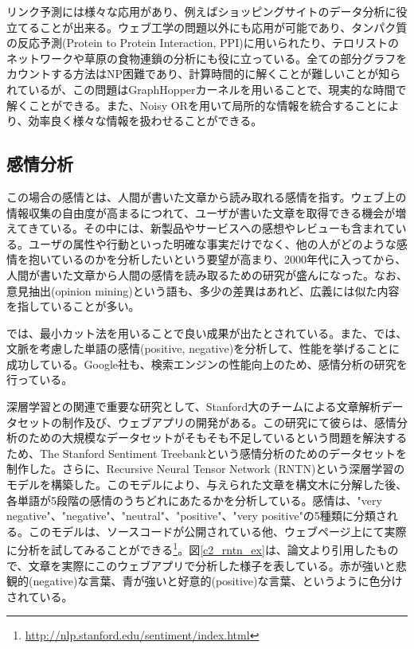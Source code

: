 リンク予測には様々な応用があり、例えばショッピングサイトのデータ分析に役立てることが出来る\cite{clauset2004finding}。ウェブ工学の問題以外にも応用が可能であり、タンパク質の反応予測(Protein to Protein Interaction, PPI)に用いられたり\cite{bader2003gaining}、テロリストのネットワークや草原の食物連鎖の分析にも役に立っている\cite{clauset2008hierarchical}。全ての部分グラフをカウントする方法はNP困難であり、計算時間的に解くことが難しいことが知られている\cite{gartner2003on-graph}が、この問題はGraphHopperカーネルを用いることで、現実的な時間で解くことができる\cite{feragen2013scalable}。また、Noisy ORを用いて局所的な情報を統合することにより、効率良く様々な情報を扱わせることができる\cite{changpinyo2013similarity}。

\subsection{感情分析}
この場合の感情とは、人間が書いた文章から読み取れる感情を指す。ウェブ上の情報収集の自由度が高まるにつれて、ユーザが書いた文章を取得できる機会が増えてきている。その中には、新製品やサービスへの感想やレビューも含まれている。ユーザの属性や行動といった明確な事実だけでなく、他の人がどのような感情を抱いているのかを分析したいという要望が高まり、2000年代に入ってから、人間が書いた文章から人間の感情を読み取るための研究が盛んになった\cite{pang2008opinion}。なお、意見抽出(opinion mining)という語も、多少の差異はあれど、広義には似た内容を指していることが多い。\par
\cite{pang2004a-sentimental}では、最小カット法を用いることで良い成果が出たとされている。また、\cite{wilson2005recognizing}では、文脈を考慮した単語の感情(positive, negative)を分析して、性能を挙げることに成功している。Google社も、検索エンジンの性能向上のため、感情分析の研究を行っている\cite{godbole2007large-scale}。\par
深層学習との関連で重要な研究として、Stanford大のチームによる文章解析データセットの制作及び、ウェブアプリの開発がある\cite{socher2013recursive}。この研究にて彼らは、感情分析のための大規模なデータセットがそもそも不足しているという問題を解決するため、The Stanford Sentiment Treebankという感情分析のためのデータセットを制作した。さらに、Recursive Neural Tensor Network (RNTN)という深層学習のモデルを構築した。このモデルにより、与えられた文章を構文木に分解した後、各単語が5段階の感情のうちどれにあたるかを分析している。感情は、"very negative"、"negative"、"neutral"、"positive"、"very positive"の5種類に分類される。このモデルは、ソースコードが公開されている他、ウェブページ上にて実際に分析を試してみることができる\footnote{\url{http://nlp.stanford.edu/sentiment/index.html}}。図\ref{c2_rntn_ex}は、論文より引用したもので、文章を実際にこのウェブアプリで分析した様子を表している。赤が強いと悲観的(negative)な言葉、青が強いと好意的(positive)な言葉、というように色分けされている。
